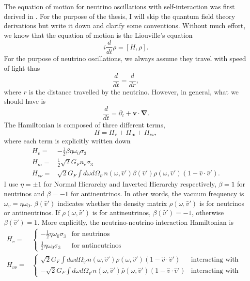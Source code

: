The equation of motion for neutrino oscillations with self-interaction was first derived in \cite{Sigl1993}. For the purpose of the thesis, I will skip the quantum field theory derivations but write it down and clarify some conventions. Without much effort, we know that the equation of motion is the Liouville's equation
\begin{equation}
   i \frac{d}{dt}\rho = [H,\rho]. 
\end{equation}
For the purpose of neutrino oscillations, we always assume they travel with speed of light thus
\begin{equation}
   \frac{d}{dt} = \frac{d}{dr}, 
\end{equation}
where $r$ is the distance travelled by the neutrino. However, in general, what we should have is
\begin{equation}
   \frac{d}{dt} = \partial_t + \mathbf v\cdot \boldsymbol{\nabla}. 
\end{equation}
The Hamiltonian is composed of three different terms,
\begin{equation}
   H = H_{\mathrm v} + H_{\mathrm m} + H_{\nu\nu}, 
\end{equation}
where each term is explicitly written down
\begin{align}
   H_v =& -\frac{1}{2}\beta\eta \omega_0 \sigma_3\\
   H_m =& \frac{1}{2} \sqrt{2}G_F n_e \sigma_3 \\
   H_{\nu\nu} =& \sqrt{2}G_F \int d\omega d\Omega_{\hat v'} n(\omega,\hat v')\beta(\hat v')\rho(\omega,\hat v') (1-\hat v \cdot \hat v').
\end{align}
I use $\eta=\pm 1$ for Normal Hierarchy and Inverted Hierarchy respectively, $\beta=1$ for neutrinos and $\beta=-1$ for antineutrinos. In other words, the vacuum frequency is $\omega_v = \eta \omega_0$. $\beta(\hat v')$ indicates whether the density matrix $\rho(\omega,\hat v')$ is for neutrinos or antineutrinos. If $\rho(\omega,\hat v')$ is for antineutrinos, $\beta(\hat v')=-1$, otherwise $\beta(\hat v')=1$. More explicitly, the neutrino-neutrino interaction Hamiltonian is
\begin{align}
   H_v =& \begin{cases}
   -\frac{1}{2}\eta \omega_0 \sigma_3 & \text{for neutrinos}\\
   \frac{1}{2}\eta \omega_0 \sigma_3 & \text{for antineutrinos}
   \end{cases}\\
   H_{\nu\nu} =& \begin{cases}
   \sqrt{2}G_F \int d\omega d\Omega_{\hat v'} n(\omega,\hat v')\rho(\omega,\hat v') (1-\hat v \cdot \hat v') & \text{interacting with neutrinos} \\
   - \sqrt{2}G_F \int d\omega d\Omega_{\hat v'} n(\omega,\hat v')\bar\rho(\omega,\hat v') (1-\hat v \cdot \hat v') &  \text{interacting with antineutrinos}
   \end{cases}
\end{align}

